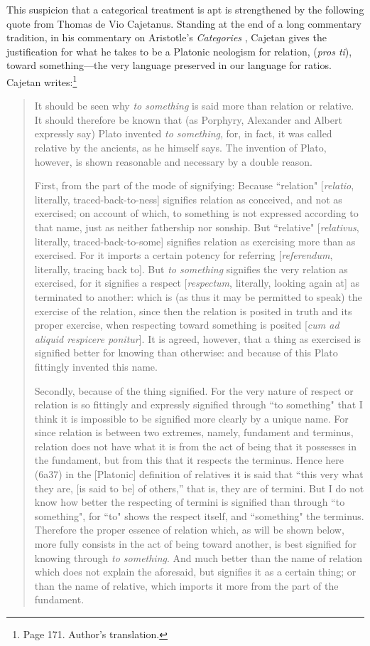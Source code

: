 \documentclass[11pt]{article}
\begin{document}
This suspicion that a categorical treatment is apt is strengthened by the following quote from Thomas de Vio Cajetanus. Standing at the end of a long commentary tradition, in his commentary \citep{cajetan1587} on Aristotle's \textit{Categories} \citep{aristotle-cat}, Cajetan gives the justification for what he takes to be a Platonic neologism for relation, (\textit{pros ti}), toward something---the very language preserved in our language for ratios. Cajetan writes:\footnote{Page 171. Author's translation.}

\begin{quotation}
It should be seen why \textit{to something} is said more than relation or relative. It should therefore be known that (as Porphyry, Alexander and Albert expressly say) Plato invented \textit{to something}, for, in fact, it was called relative by the ancients, as he himself says. The invention of Plato, however, is shown reasonable and necessary by a double reason.

First, from the part of the mode of signifying: Because ``relation" [\textit{relatio}, literally, traced-back-to-ness] signifies relation as conceived, and not as exercised; on account of which, to something is not expressed according to that name, just as neither fathership nor sonship. But ``relative" [\textit{relativus}, literally, traced-back-to-some] signifies relation as exercising more than as exercised. For it imports a certain potency for referring [\textit{referendum}, literally, tracing back to]. But \textit{to something} signifies the very relation as exercised, for it signifies a respect [\textit{respectum}, literally, looking again at] as terminated to another: which is (as thus it may be permitted to speak) the exercise of the relation, since then the relation is posited in truth and its proper exercise, when respecting toward something is posited [\textit{cum ad aliquid respicere ponitur}]. It is agreed, however, that a thing as exercised is signified better for knowing than otherwise: and because of this Plato fittingly invented this name.

Secondly, because of the thing signified. For the very nature of respect or relation is so fittingly and expressly signified through ``to something" that I think it is impossible to be signified more clearly by a unique name. For since relation is between two extremes, namely, fundament and terminus, relation does not have what it is from the act of being that it possesses in the fundament, but from this that it respects the terminus. Hence here (6a37) in the [Platonic] definition of relatives it is said that “this very what they are, [is said to be] of others,” that is, they are of termini. But I do not know how better the respecting of termini is signified than through ``to something", for ``to" shows the respect itself, and ``something" the terminus. Therefore the proper essence of relation which, as will be shown below, more fully consists in the act of being toward another, is best signified for knowing through \textit{to something}. And much better than the name of relation which does not explain the aforesaid, but signifies it as a certain thing; or than the name of relative, which imports it more from the part of the fundament.


\end{quotation}
\end{document}
